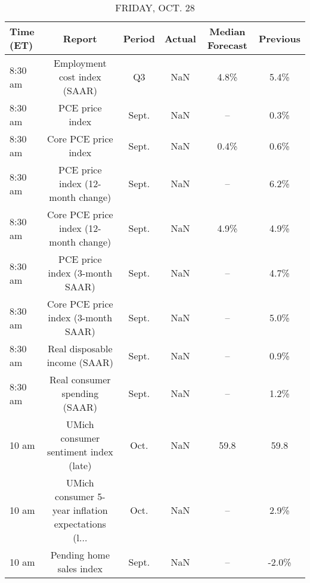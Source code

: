 \documentclass{article}%
\begin{document}
\begin{table}[htbp]%
\caption{FRIDAY, OCT. 28}%
\centering%
\begin{adjustbox}{width=1\textwidth}%
\begin{tabular}{lccccc}
\toprule
Time (ET) &                                             Report & Period & Actual & Median Forecast & Previous \\
\midrule
  8:30 am &                       Employment cost index (SAAR) &     Q3 &    NaN &            4.8\% &     5.4\% \\
  8:30 am &                                    PCE price index &  Sept. &    NaN &              -- &     0.3\% \\
  8:30 am &                               Core PCE price index &  Sept. &    NaN &            0.4\% &     0.6\% \\
  8:30 am &                  PCE price index (12-month change) &  Sept. &    NaN &              -- &     6.2\% \\
  8:30 am &             Core PCE price index (12-month change) &  Sept. &    NaN &            4.9\% &     4.9\% \\
  8:30 am &                     PCE price index (3-month SAAR) &  Sept. &    NaN &              -- &     4.7\% \\
  8:30 am &                Core PCE price index (3-month SAAR) &  Sept. &    NaN &              -- &     5.0\% \\
  8:30 am &                      Real disposable income (SAAR) &  Sept. &    NaN &              -- &     0.9\% \\
  8:30 am &                      Real consumer spending (SAAR) &  Sept. &    NaN &              -- &     1.2\% \\
    10 am &              UMich consumer sentiment index (late) &   Oct. &    NaN &            59.8 &     59.8 \\
    10 am & UMich consumer 5-year inflation expectations (l... &   Oct. &    NaN &              -- &     2.9\% \\
    10 am &                           Pending home sales index &  Sept. &    NaN &              -- &    -2.0\% \\
\bottomrule
\end{tabular}
%
\end{adjustbox}%
\end{table}
\end{document}
